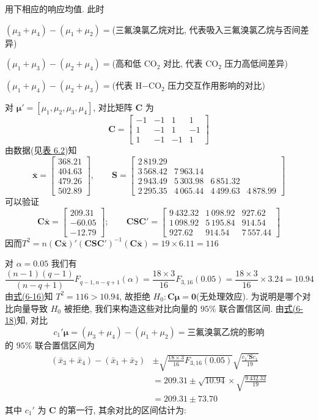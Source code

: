 \noindent 用下相应的响应均值. 此时

\noindent $(\mu_{3}+\mu_{4})-(\mu_{1}+\mu_{2})=$(三氟溴氯乙烷对比, 代表吸入三氟溴氯乙烷与否间差异)

\noindent $(\mu_{1}+\mu_{3})-(\mu_{2}+\mu_{4})=$(高和低 $\mathrm{CO}_{2}$ 对比, 代表 $\mathrm{CO}_{2}$ 压力高低间差异)

\noindent $(\mu_{1}+\mu_{4})-(\mu_{2}+\mu_{3})=$(代表 H$-\mathrm{CO}_{2}$ 压力交互作用影响的对比)

对 $\boldsymbol{\mu}'=[\mu_{1},\mu_{2},\mu_{3},\mu_{4}]$, 对比矩阵 $\mathbf{C}$ 为
\[
\mathbf{C}=\begin{bmatrix}
-1&-1&1&1\\
1&-1&1&-1\\
1&-1&-1&1
\end{bmatrix}
\]
由数据(见\hyperref[tab:6.2]{表 6.2})知
\[
\bar{\mathbf{x}}=\begin{bmatrix}368.21\\404.63\\479.26\\502.89\end{bmatrix},\qquad
\mathbf{S}=\begin{bmatrix}
2\,819.29&&&\\
3\,568.42&7\,963.14&&\\
2\,943.49&5\,303.98&6\,851.32&\\
2\,295.35&4\,065.44&4\,499.63&4\,878.99
\end{bmatrix}
\]
可以验证
\[
\mathbf{C}\bar{\mathbf{x}}=\begin{bmatrix}209.31\\-60.05\\-12.79\end{bmatrix};\qquad
\mathbf{C}\mathbf{S}\mathbf{C}'=\begin{bmatrix}
9\,432.32&1\,098.92&927.62\\
1\,098.92&5\,195.84&914.54\\
927.62&914.54&7\,557.44
\end{bmatrix}
\]
因而\quad $T^{2}=n(\mathbf{C}\bar{\mathbf{x}})'(\mathbf{C}\mathbf{S}\mathbf{C}')^{-1}(\mathbf{C}\bar{\mathbf{x}})=19\times 6.11=116$

对 $\alpha=0.05$ 我们有
\[
\frac{(n-1)(q-1)}{(n-q+1)}F_{q-1,n-q+1}(\alpha)=\frac{18\times 3}{16}F_{3,16}(0.05)=\frac{18\times 3}{16}\times 3.24=10.94
\]
由\hyperref[eq:6-16]{式(6-16)}知 $T^{2}=116>10.94$, 故拒绝 $H_{0}: \mathbf{C}\boldsymbol{\mu}=\mathbf{0}$(无处理效应). 为说明是哪个对比向量导致 $H_{0}$ 被拒绝, 我们来构造这些对比向量的 $95\%$ 联合置信区间. 由\hyperref[eq:6-18]{式(6-18)}知, 对比
\[
c_{1}'\boldsymbol{\mu}=(\mu_{3}+\mu_{4})-(\mu_{1}+\mu_{2})=\text{三氟溴氯乙烷的影响}
\]
的 $95\%$ 联合置信区间为
\begin{align*}
(\bar{x}_{3}+\bar{x}_{4})-(\bar{x}_{1}+\bar{x}_{2})&\pm\sqrt{\frac{18\times 3}{16}F_{3,16}(0.05)}\sqrt{\frac{c_{1}'\mathbf{S}c_{1}}{19}}\\
&=209.31\pm\sqrt{10.94}\times\sqrt{\frac{9\,432.32}{19}}\\
&=209.31\pm 73.70
\end{align*}
其中 $c_{1}'$ 为 $\mathbf{C}$ 的第一行, 其余对比的区间估计为:

